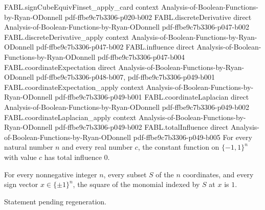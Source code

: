 \begin{theorem}
  {FABL.signCubeEquivFinset_apply_card}
  {context}
  {Analysis-of-Boolean-Functions-by-Ryan-ODonnell}
  {pdf-ffbe9c7b3306-p020-b002}
\proofstep
  {FABL.discreteDerivative}
  {direct}
  {Analysis-of-Boolean-Functions-by-Ryan-ODonnell}
  {pdf-ffbe9c7b3306-p047-b002}
\proofstep
  {FABL.discreteDerivative_apply}
  {context}
  {Analysis-of-Boolean-Functions-by-Ryan-ODonnell}
  {pdf-ffbe9c7b3306-p047-b002}
\proofstep
  {FABL.influence}
  {direct}
  {Analysis-of-Boolean-Functions-by-Ryan-ODonnell}
  {pdf-ffbe9c7b3306-p047-b004}
\proofstep
  {FABL.coordinateExpectation}
  {direct}
  {Analysis-of-Boolean-Functions-by-Ryan-ODonnell}
  {pdf-ffbe9c7b3306-p048-b007,
    pdf-ffbe9c7b3306-p049-b001}
\proofstep
  {FABL.coordinateExpectation_apply}
  {context}
  {Analysis-of-Boolean-Functions-by-Ryan-ODonnell}
  {pdf-ffbe9c7b3306-p049-b001}
\proofstep
  {FABL.coordinateLaplacian}
  {direct}
  {Analysis-of-Boolean-Functions-by-Ryan-ODonnell}
  {pdf-ffbe9c7b3306-p049-b002}
\proofstep
  {FABL.coordinateLaplacian_apply}
  {context}
  {Analysis-of-Boolean-Functions-by-Ryan-ODonnell}
  {pdf-ffbe9c7b3306-p049-b002}
\proofstep
  {FABL.totalInfluence}
  {direct}
  {Analysis-of-Boolean-Functions-by-Ryan-ODonnell}
  {pdf-ffbe9c7b3306-p049-b005}
For every natural number $n$ and every real number $c$, the constant function on
$\{-1,1\}^n$ with value $c$ has total influence $0$.
\end{theorem}

\begin{theorem}
\label{FABL.monomial_sq}
\leanok
{}
For every nonnegative integer $n$, every subset $S$ of the $n$ coordinates, and every
sign vector $x\in\{\pm1\}^n$, the square of the monomial indexed by $S$ at $x$ is $1$.
\end{theorem}

\begin{theorem}
\label{FABL.influence_monomial}
\leanok
{}
Statement pending regeneration.
\end{theorem}

